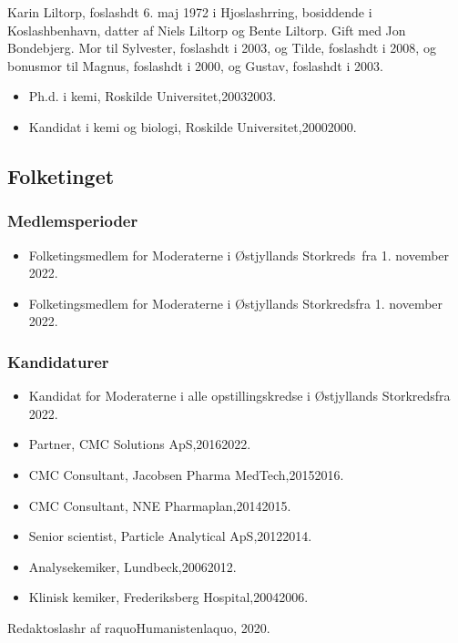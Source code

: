 \documentclass[11pt, a4paper]{awesome-cv}
\begin{document}
\makecvheader[R]
\makelettertitle
\begin{cvletter}
Karin Liltorp, foslashdt 6. maj 1972 i Hjoslashrring, bosiddende i Koslashbenhavn, datter af Niels Liltorp og Bente Liltorp. Gift med Jon Bondebjerg. Mor til Sylvester, foslashdt i 2003, og Tilde, foslashdt i 2008, og bonusmor til Magnus, foslashdt i 2000, og Gustav, foslashdt i 2003.

\begin{itemize}
\item Ph.d. i kemi, Roskilde Universitet,20032003.
\item Kandidat i kemi og biologi, Roskilde Universitet,20002000.
\end{itemize}
\subsection*{Folketinget}
\subsubsection*{Medlemsperioder}
\begin{itemize}
\item Folketingsmedlem for Moderaterne i Østjyllands Storkreds fra 1. november 2022.
\item Folketingsmedlem for Moderaterne i Østjyllands Storkredsfra 1. november 2022.
\end{itemize}
\subsubsection*{Kandidaturer}
\begin{itemize}
\item Kandidat for Moderaterne i alle opstillingskredse i Østjyllands Storkredsfra 2022.
\end{itemize}
\begin{itemize}
\item Partner, CMC Solutions ApS,20162022.
\item CMC Consultant, Jacobsen Pharma  MedTech,20152016.
\item CMC Consultant, NNE Pharmaplan,20142015.
\item Senior scientist, Particle Analytical ApS,20122014.
\item Analysekemiker, Lundbeck,20062012.
\item Klinisk kemiker, Frederiksberg Hospital,20042006.
\end{itemize}
Redaktoslashr af raquoHumanistenlaquo, 2020.

\end{cvletter}
\end{document}
